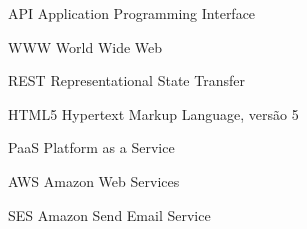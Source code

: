 \begin{siglas}
  \item[API] Application Programming Interface
  \item[WWW] World Wide Web
  \item[REST] Representational State Transfer
  \item[HTML5] Hypertext Markup Language, versão 5
  \item[PaaS] Platform as a Service
  \item[AWS] Amazon Web Services
  \item[SES] Amazon Send Email Service
\end{siglas}